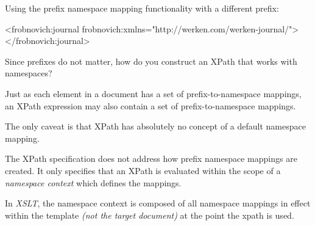\documentclass[20pt,landscape,headrule,footrule]{foils}
\begin{document}
Using the prefix namespace mapping functionality with a different
prefix:

\begin{codelisting}
<frobnovich:journal frobnovich:xmlns="http://werken.com/werken-journal/">
</frobnovich:journal>
\end{codelisting}



Since prefixes do not matter, how do you construct an XPath that
works with namespaces?

\begin{center}
\end{center}

Just as each element in a document has a set of prefix-to-namespace
mappings, an XPath expression may also contain a set of
prefix-to-namespace mappings.

The only caveat is that XPath has absolutely no concept of a default
namespace mapping.  




The XPath specification does not address how prefix namespace mappings
are created.  It only specifies that an XPath is evaluated within the
scope of a \emph{namespace context} which defines the mappings.

In \emph{XSLT}, the namespace context is composed of all namespace
mappings in effect within the template \emph{(not the target document)}
at the point the xpath is used.

\begin{codelisting}
\end{codelisting}

\end{document}
